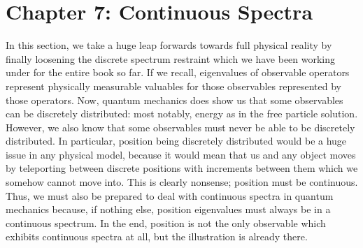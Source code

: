 \chapter{Chapter 7: Continuous Spectra}
In this section, we take a huge leap forwards towards full physical reality by finally loosening the discrete spectrum restraint which we have been working under for the entire book so far. If we recall, eigenvalues of observable operators represent physically measurable valuables for those observables represented by those operators. Now, quantum mechanics does show us that some observables can be discretely distributed: most notably, energy as in the free particle solution. However, we also know that some observables must never be able to be discretely distributed. In particular, position being discretely distributed would be a huge issue in any physical model, because it would mean that us and any object moves by teleporting between discrete positions with increments between them which we somehow cannot move into. This is clearly nonsense; position must be continuous. Thus, we must also be prepared to deal with continuous spectra in quantum mechanics because, if nothing else, position eigenvalues must always be in a continuous spectrum. In the end, position is not the only observable which exhibits continuous spectra at all, but the illustration is already there.

